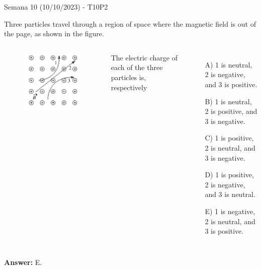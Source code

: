 \begin{frame}{Semana 10 (10/10/2023) - T10P2}
    
    Three particles travel through a region of space where the magnetic field is out of the page, as shown in the figure.
    
    \begin{columns}
        \begin{figure}
        \centering
        \includegraphics[scale=0.3]{figures/t8p2.png}
    \end{figure}
    
    The electric charge of each of the three particles is, respectively
    \begin{itemize}
       \item[A)] 1 is neutral, 2 is negative, and 3 is positive.
       \item[B)] 1 is neutral, 2 is positive, and 3 is negative.
       \item[C)] 1 is positive, 2 is neutral, and 3 is negative.
       \item[D)] 1 is positive, 2 is negative, and 3 is neutral.
       \item[E)] 1 is negative, 2 is neutral, and 3 is positive.
   \end{itemize}
    \end{columns}
    \pause \centering \textbf{Answer:} E.
    
\end{frame}


